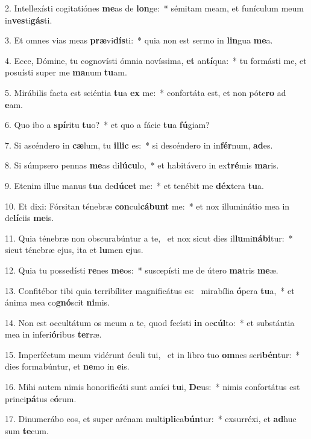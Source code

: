 2. Intellexísti cogitatiónes \textbf{me}as de \textbf{lon}ge:~*  sémitam meam, et funículum meum in\textbf{ves}ti\textbf{gás}ti.\

3. Et omnes vias meas \textbf{præ}vi\textbf{dís}ti:~*  quia non est sermo in \textbf{lin}gua \textbf{me}a.\

4. Ecce, Dómine, tu cognovísti ómnia novíssima, \textbf{et} an\textbf{tí}qua:~*  tu formásti me, et posuísti super me \textbf{ma}num \textbf{tu}am.\

5. Mirábilis facta est sciéntia \textbf{tu}a \textbf{ex} me:~*  confortáta est, et non póte\textbf{ro} ad \textbf{e}am.\

6. Quo ibo a \textbf{spí}ritu \textbf{tu}o?~*  et quo a fácie \textbf{tu}a \textbf{fú}giam?\

7. Si ascéndero in \textbf{cæ}lum, tu \textbf{il}\textbf{lic} es:~*  si descéndero in in\textbf{fér}num, \textbf{ad}es.\

8. Si súmpsero pennas \textbf{me}as di\textbf{lú}\textbf{cu}lo,~*  et habitávero in ex\textbf{tré}mis \textbf{ma}ris.\

9. Etenim illuc manus \textbf{tu}a de\textbf{dú}\textbf{cet} me:~*  et tenébit me \textbf{déx}tera \textbf{tu}a.\

10. Et dixi: Fórsitan ténebræ \textbf{con}cul\textbf{cá}\textbf{bunt} me:~*  et nox illuminátio mea in de\textbf{lí}ciis \textbf{me}is.\

11. Quia ténebræ non obscurabúntur a te, \dag\  et nox sicut dies il\textbf{lu}mi\textbf{ná}\textbf{bi}tur:~*  sicut ténebræ ejus, ita et \textbf{lu}men \textbf{e}jus.\

12. Quia tu possedísti \textbf{re}nes \textbf{me}os:~*  suscepísti me de útero \textbf{ma}tris \textbf{me}æ.\

13. Confitébor tibi quia terribíliter magnificátus es: \dag\  mirabília \textbf{ó}pera \textbf{tu}a,~*  et ánima mea co\textbf{gnó}scit \textbf{ni}mis.\

14. Non est occultátum os meum a te, quod fecísti \textbf{in} oc\textbf{cúl}to:~*  et substántia mea in inferi\textbf{ó}ribus \textbf{ter}ræ.\

15. Imperféctum meum vidérunt óculi tui, \dag\  et in libro tuo \textbf{om}nes scri\textbf{bén}tur:~*  dies formabúntur, et \textbf{ne}mo in \textbf{e}is.\

16. Mihi autem nimis honorificáti sunt amíci \textbf{tu}i, \textbf{De}us:~*  nimis confortátus est princi\textbf{pá}tus e\textbf{ó}rum.\

17. Dinumerábo eos, et super arénam multi\textbf{pli}ca\textbf{bún}tur:~*  exsurréxi, et \textbf{ad}huc sum \textbf{te}cum.\

